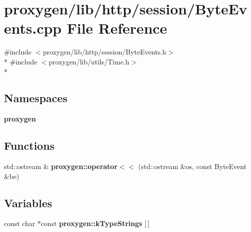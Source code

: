 \section{proxygen/lib/http/session/\+Byte\+Events.cpp File Reference}
\label{ByteEvents_8cpp}
{\ttfamily \#include $<$proxygen/lib/http/session/\+Byte\+Events.\+h$>$}\\*
{\ttfamily \#include $<$proxygen/lib/utils/\+Time.\+h$>$}\\*
\subsection*{Namespaces}
\begin{DoxyCompactItemize}
\item 
 {\bf proxygen}
\end{DoxyCompactItemize}
\subsection*{Functions}
\begin{DoxyCompactItemize}
\item 
std\+::ostream \& {\bf proxygen\+::operator$<$$<$} (std\+::ostream \&os, const Byte\+Event \&be)
\end{DoxyCompactItemize}
\subsection*{Variables}
\begin{DoxyCompactItemize}
\item 
const char $\ast$const {\bf proxygen\+::k\+Type\+Strings} [$\,$]
\end{DoxyCompactItemize}
